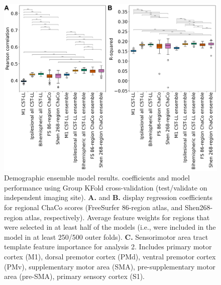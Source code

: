 \documentclass[10pt]{article}
\begin{document}
\begin{figure}[htp]
\centering
\includegraphics[width=1\linewidth]{figures/Analysis3.png}
\caption{Demographic ensemble model results. coefficients and model performance using Group KFold cross-validation (test/validate on independent imaging site). \textbf{A.} and \textbf{B.} display regression coefficients for regional ChaCo scores (FreeSurfer 86-region atlas, and Shen268-region atlas, respectively). Average feature weights for regions that were selected in at least half of the models (i.e., were included in the model in at least 250/500 outer folds). \textbf{C.} Sensorimotor area tract template feature importance for analysis 2. Includes primary motor cortex (M1), dorsal premotor cortex (PMd), ventral premotor cortex (PMv), supplementary motor area (SMA), pre-supplementary motor area (pre-SMA), primary sensory cortex (S1).}
\label{nemotool}
\end{figure}
\end{document}
